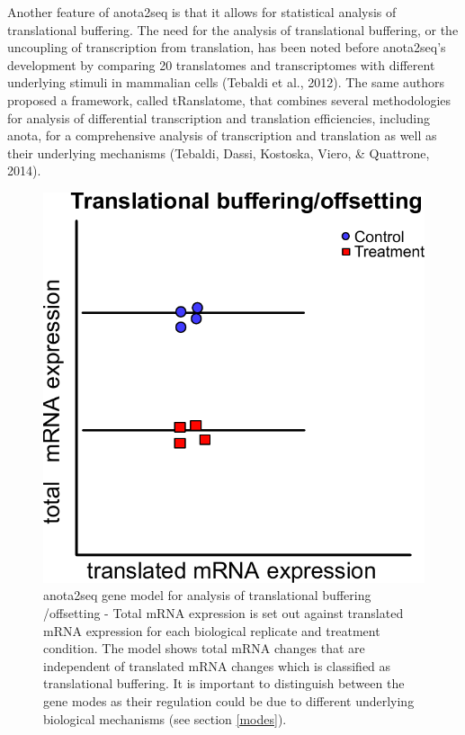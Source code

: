 \documentclass[12pt,openany]{book}
\begin{document}
Another feature of anota2seq is that it allows for statistical analysis
of translational buffering. The need for the analysis of translational
buffering, or the uncoupling of transcription from translation, has been
noted before anota2seq's development by comparing 20 translatomes and
transcriptomes with different underlying stimuli in mammalian cells
(Tebaldi et al., 2012). The same authors proposed a framework, called
tRanslatome, that combines several methodologies for analysis of
differential transcription and translation efficiencies, including
anota, for a comprehensive analysis of transcription and translation as
well as their underlying mechanisms (Tebaldi, Dassi, Kostoska, Viero, \&
Quattrone, 2014).

\begin{figure}
  \includegraphics{./figures/geneModes_anota2seq.pdf}
  \caption{anota2seq gene model for analysis of translational buffering /offsetting - Total mRNA expression is set out against translated mRNA expression for each biological replicate and treatment condition. The model shows total mRNA changes that are independent of translated mRNA changes which is classified as translational buffering. It is important to distinguish between the gene modes as their regulation could be due to different underlying biological mechanisms (see section \ref{modes}).
  \label{fig:anota2seq}}
\end{figure}
\end{document}
